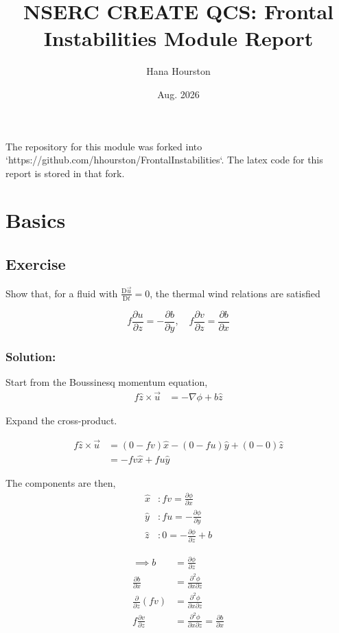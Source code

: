 \documentclass[12 pt]{article}
\title{NSERC CREATE QCS: Frontal Instabilities Module Report}
\author{Hana Hourston}
\date{Aug. 2026}
\numberwithin{equation}{section} %
\begin{document}
\maketitle

The repository for this module was forked into `https://github.com/hhourston/FrontalInstabilities`. The latex code for this report is stored in that fork.

\section{Basics}

\subsection{Exercise}
Show that, for a fluid with $\frac{\text{D}\vec{u}}{\text{D}t} = 0$, the thermal wind relations are satisfied

\begin{equation}
  \label{eq:thermal-wind}
  f\frac{\partial u}{\partial z} = -\frac{\partial b}{\partial y}, \quad f\frac{\partial v}{\partial z} = \frac{\partial b}{\partial x}
\end{equation}

\subsubsection*{Solution:}
Start from the Boussinesq momentum equation,
\begin{align*}
  f \hat{z} \times \vec{u} &= -\nabla \phi + b\hat{z}
\end{align*}

Expand the cross-product.

\begin{align*}
  f \hat{z} \times \vec{u} &= (0-fv)\hat{x} - (0-fu)\hat{y} + (0-0)\hat{z} \\
  &= -fv\hat{x} + fu\hat{y}
\end{align*}

The components are then,
\begin{align*}
  \hat{x}&: fv = \frac{\partial \phi}{\partial x} \\
  \hat{y}&: fu = -\frac{\partial \phi}{\partial y} \\
  \hat{z}&: 0 = -\frac{\partial \phi}{\partial z} + b
\end{align*}

\begin{align*}
  \implies b &= \frac{\partial \phi}{\partial z} \\
  \frac{\partial b}{\partial x} &= \frac{\partial^2 \phi}{\partial x \partial z} \\
  \frac{\partial}{\partial z}(fv) &= \frac{\partial^2 \phi}{\partial x \partial z} \\
  f\frac{\partial v}{\partial z} &= \frac{\partial^2 \phi}{\partial x \partial z} = \frac{\partial b}{\partial x}
\end{align*}
\end{document}
